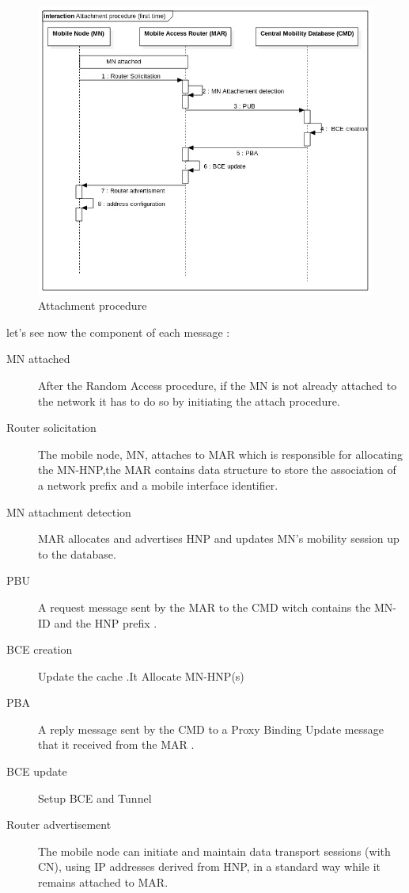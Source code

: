 \documentclass{article}
\begin{document}
\begin{figure}[h!]
  \centering
    \includegraphics[scale=0.5]{reportPictures/figure7.jpg}
  \caption{Attachment procedure}
\end{figure}

let's see now the component of each message : \\
\newline

\begin{description}
  \item[MN attached]
After the Random Access procedure, if the MN is not already attached
to the network it has to do so by initiating the attach procedure.
  \item[Router solicitation]
The mobile node, MN, attaches to MAR which is responsible for
allocating the MN-HNP,the MAR contains data structure to store the
association of a network prefix and a mobile interface identifier.
  \item[MN attachment detection]
MAR allocates and advertises HNP and updates MN's mobility session up
to the database.
  \item[PBU]
A request message sent by the MAR to the CMD witch contains the MN-ID
and the HNP prefix .
  \item[BCE creation]
Update the cache .It Allocate MN-HNP(s)
  \item[PBA] 
A reply message sent by the CMD to a Proxy Binding Update message that
it received from the MAR .
  \item[BCE update] 
Setup BCE and Tunnel
  \item[Router advertisement] 
The mobile node can initiate and maintain data transport sessions
(with CN), using IP addresses derived from HNP, in a standard way
while it remains attached to MAR.
\end{description}
\end{document}
